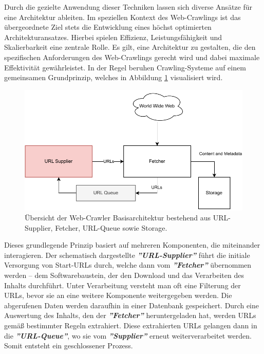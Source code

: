 Durch die gezielte Anwendung dieser Techniken lassen sich diverse Ansätze für eine Architektur ableiten. Im speziellen Kontext des Web-Crawlings ist das übergeordnete Ziel stets die Entwicklung eines höchst optimierten Architekturansatzes. Hierbei spielen Effizienz, Leistungsfähigkeit und Skalierbarkeit eine zentrale Rolle. Es gilt, eine Architektur zu gestalten, die den spezifischen Anforderungen des Web-Crawlings gerecht wird und dabei maximale Effektivität gewährleistet.
\newline
In der Regel beruhen Crawling-Systeme auf einem gemeinsamen Grundprinzip, welches in Abbildung \ref{fig:architecture-general} visualisiert wird.
\begin{figure}[H]
    \centering
    \includegraphics[width=14cm]{images/40_concept/HighLevelArch.pdf}
    \caption[Übersicht der Web-Crawler Basisarchitektur]{Übersicht der Web-Crawler Basisarchitektur bestehend aus URL-Supplier, Fetcher, URL-Queue sowie Storage.}
    \label{fig:architecture-general}
\end{figure}

Dieses grundlegende Prinzip basiert auf mehreren Komponenten, die miteinander interagieren. Der schematisch dargestellte \textbf{\textit{''URL-Supplier''}} führt die initiale Versorgung von Start-URLs durch, welche dann vom \textbf{\textit{''Fetcher''}} übernommen werden – dem Softwarebaustein, der den Download und das Verarbeiten des Inhalts durchführt. Unter Verarbeitung versteht man oft eine Filterung der URLs, bevor sie an eine weitere Komponente weitergegeben werden. Die abgerufenen Daten werden daraufhin in einer Datenbank gespeichert. Durch eine Auswertung des Inhalts, den der \textbf{\textit{''Fetcher''}} heruntergeladen hat, werden URLs gemäß bestimmter Regeln extrahiert. Diese extrahierten URLs gelangen dann in die \textbf{\textit{''URL-Queue''}}, wo sie vom \textbf{\textit{''Supplier''}} erneut weiterverarbeitet werden. Somit entsteht ein geschlossener Prozess.

